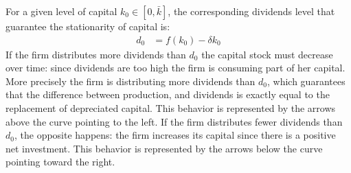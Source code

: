 \documentclass[12pt]{report}
\begin{document}
For a given level of capital \(k_0 \in [0,\bar{k}]\), the corresponding dividends level that
guarantee the stationarity of capital is:
\begin{align*}
    d_0 &= f(k_0) -\delta k_0
\end{align*}
If the firm distributes more dividends than \(d_0\) the capital stock must decrease over time: since
dividends are too high the firm is consuming part of her capital. More precisely the firm is distributing more dividends than
\(d_0\), which guarantees that the difference between production, and dividends is exactly equal to the replacement of
depreciated capital.
This behavior is represented by the arrows above the curve pointing to the left. If the firm distributes fewer
dividends than \(d_0\), the opposite happens: the firm increases its capital since there is a positive net
investment. This behavior is represented by
the arrows below the curve pointing toward the right. 
\end{document}
